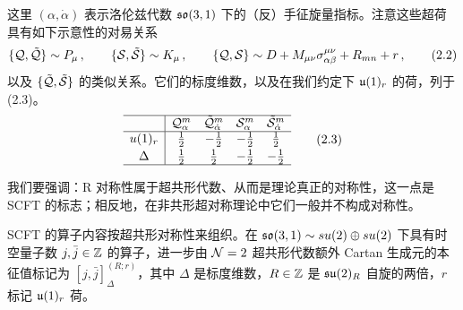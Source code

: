 这里 $(\alpha,\dot\alpha)$ 表示洛伦兹代数 $\mathfrak{so}(3,1)$ 下的（反）手征旋量指标。注意这些超荷具有如下示意性的对易关系
\begin{equation}
  \{\mathcal{Q},\tilde{\mathcal{Q}}\}\sim P_\mu\,,\qquad
  \{\mathcal{S},\tilde{\mathcal{S}}\}\sim K_\mu\,,\qquad
  \{\mathcal{Q},\mathcal{S}\}\sim D+M_{\mu\nu}\sigma^{\mu\nu}_{\alpha\beta}+R_{mn}+r\,,
  \tag{2.2}
\end{equation}
以及 $\{\tilde{\mathcal{Q}},\tilde{\mathcal{S}}\}$ 的类似关系。它们的标度维数，以及在我们约定下 $\mathfrak{u}(1)_r$ 的荷，列于 (2.3)。
\begin{equation}
  \begin{array}{c|cccc}
    \hline
    & \mathcal{Q}^{m}_{\alpha} & \tilde{\mathcal{Q}}^{m}_{\dot\alpha} & \mathcal{S}^{m}_{\alpha} & \tilde{\mathcal{S}}^{m}_{\dot\alpha}\\
    \hline
    u(1)_r & \frac12 & -\frac12 & -\frac12 & \frac12\\[2pt]
    \Delta & \frac12 & \frac12 & -\frac12 & -\frac12\\
    \hline
  \end{array}
  \tag{2.3}
\end{equation}

我们要强调：R 对称性属于超共形代数、从而是理论真正的对称性，这一点是 SCFT 的标志；相反地，在非共形超对称理论中它们一般并不构成对称性。

SCFT 的算子内容按超共形对称性来组织。在 $\mathfrak{so}(3,1)\sim su(2)\oplus su(2)$ 下具有时空量子数 $j,\bar j\in\mathbb{Z}$ 的算子，进一步由 $\mathcal{N}=2$ 超共形代数额外 Cartan 生成元的本征值标记为 $[j,\bar j]^{(R;r)}_\Delta$，其中 $\Delta$ 是标度维数，$R\in\mathbb{Z}$ 是 $\mathfrak{su}(2)_R$ 自旋的两倍，$r$ 标记 $\mathfrak{u}(1)_r$ 荷。


